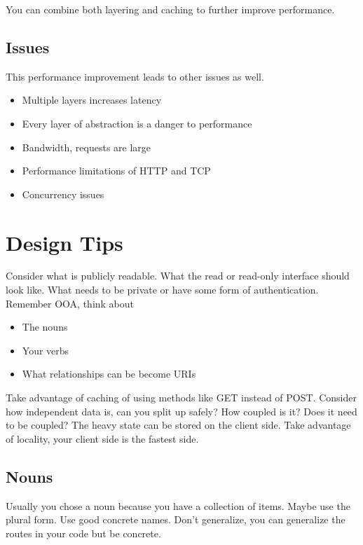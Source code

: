 \documentclass[../CMPUT-404-Notes.tex]{subfiles}
\begin{document}
You can combine both layering and caching to further improve performance.

\vspace{-5pt}
\subsection{Issues}
This performance improvement leads to other issues as well.
\begin{itemize}
  \item Multiple layers increases latency
  \item Every layer of abstraction is a danger to performance
  \item Bandwidth, requests are large
  \item Performance limitations of HTTP and TCP
  \item Concurrency issues
\end{itemize}


\section{Design Tips}
Consider what is publicly readable. What the read or read-only interface should look like.
What needs to be private or have some form of authentication.
Remember OOA, think about
\begin{itemize}
  \item The nouns
  \item Your verbs
  \item What relationships can be become URIs
\end{itemize}

Take advantage of caching of using methods like GET instead of POST.
Consider how independent data is, can you split up safely? How coupled is it? Does it need to be coupled?
The heavy state can be stored on the client side. Take advantage of locality, your client side is the fastest side.

\subsection{Nouns}
Usually you chose a noun because you have a collection of items. Maybe use the plural form.
Use good concrete names. Don't generalize, you can generalize the routes in your code but be concrete.
\end{document}
